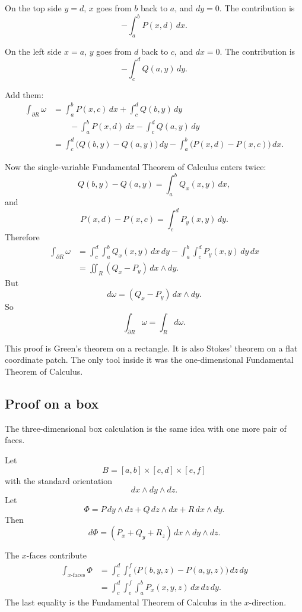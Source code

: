 On the top side \(y=d\), \(x\) goes from \(b\) back to \(a\), and \(dy=0\).  The
contribution is
\[
    -\int_a^b P(x,d)\,dx.
\]

On the left side \(x=a\), \(y\) goes from \(d\) back to \(c\), and \(dx=0\).  The
contribution is
\[
    -\int_c^d Q(a,y)\,dy.
\]

Add them:
\[
\begin{aligned}
    \int_{\partial R}\omega
    &=
    \int_a^b P(x,c)\,dx
    +
    \int_c^d Q(b,y)\,dy\\
    &\qquad
    -
    \int_a^b P(x,d)\,dx
    -
    \int_c^d Q(a,y)\,dy\\
    &=
    \int_c^d\bigl(Q(b,y)-Q(a,y)\bigr)\,dy
    -
    \int_a^b\bigl(P(x,d)-P(x,c)\bigr)\,dx.
\end{aligned}
\]

Now the single-variable Fundamental Theorem of Calculus enters twice:
\[
    Q(b,y)-Q(a,y)=\int_a^b Q_x(x,y)\,dx,
\]
and
\[
    P(x,d)-P(x,c)=\int_c^d P_y(x,y)\,dy.
\]
Therefore
\[
\begin{aligned}
    \int_{\partial R}\omega
    &=
    \int_c^d\int_a^b Q_x(x,y)\,dx\,dy
    -
    \int_a^b\int_c^d P_y(x,y)\,dy\,dx\\
    &=
    \iint_R (Q_x-P_y)\,dx\wedge dy.
\end{aligned}
\]
But
\[
    d\omega=(Q_x-P_y)\,dx\wedge dy.
\]
So
\[
\boxed{
    \int_{\partial R}\omega=\int_R d\omega.
}
\]

This proof is Green's theorem on a rectangle.  It is also Stokes' theorem on a flat
coordinate patch.  The only tool inside it was the one-dimensional Fundamental
Theorem of Calculus.

\subsection{Proof on a box}

The three-dimensional box calculation is the same idea with one more pair of faces.

Let
\[
    B=[a,b]\times[c,d]\times[e,f]
\]
with the standard orientation
\[
    dx\wedge dy\wedge dz.
\]
Let
\[
    \Phi=P\,dy\wedge dz+Q\,dz\wedge dx+R\,dx\wedge dy.
\]
Then
\[
    d\Phi=(P_x+Q_y+R_z)\,dx\wedge dy\wedge dz.
\]

The \(x\)-faces contribute
\[
\begin{aligned}
    \int_{\text{\(x\)-faces}}\Phi
    &=
    \int_c^d\int_e^f
    \bigl(P(b,y,z)-P(a,y,z)\bigr)\,dz\,dy\\
    &=
    \int_c^d\int_e^f\int_a^b
    P_x(x,y,z)\,dx\,dz\,dy.
\end{aligned}
\]
The last equality is the Fundamental Theorem of Calculus in the \(x\)-direction.

